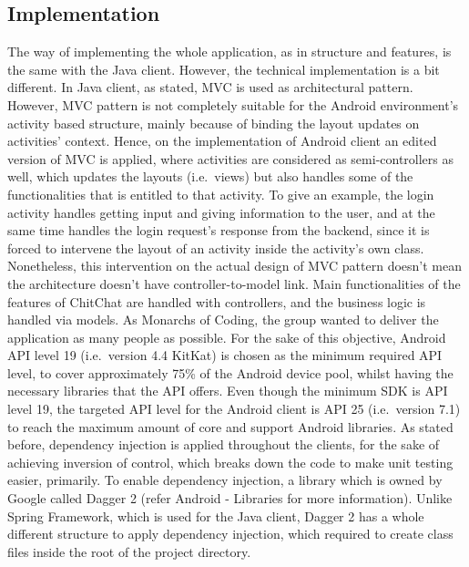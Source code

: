 \documentclass[11pt,a4paper]{report}
\begin{document}
\subsection{Implementation}
The way of implementing the whole application, as in structure and features, is the same with the Java client. However, the technical implementation is a bit different. In Java client, as stated, MVC is used as architectural pattern. However, MVC pattern is not completely suitable for the Android environment’s activity based structure, mainly because of binding the layout updates on activities’ context. Hence, on the implementation of Android client an edited version of MVC is applied, where activities are considered as semi-controllers as well, which updates the layouts (i.e.\ views) but also handles some of the functionalities that is entitled to that activity. To give an example, the login activity handles getting input and giving information to the user, and at the same time handles the login request’s response from the backend, since it is forced to intervene the layout of an activity inside the activity’s own class. Nonetheless, this intervention on the actual design of MVC pattern doesn’t mean the architecture doesn’t have controller-to-model link. Main functionalities of the features of ChitChat are handled with controllers, and the business logic is handled via models.
As Monarchs of Coding, the group wanted to deliver the application as many people as possible. For the sake of this objective, Android API level 19 (i.e.\ version 4.4 KitKat) is chosen as the minimum required API level, to cover approximately 75\% of the Android device pool, whilst having the necessary libraries that the API offers. Even though the minimum SDK is API level 19, the targeted API level for the Android client is API 25 (i.e.\ version 7.1) to reach the maximum amount of core and support Android libraries.
As stated before, dependency injection is applied throughout the clients, for the sake of achieving inversion of control, which breaks down the code to make unit testing easier, primarily. To enable dependency injection, a library which is owned by Google called Dagger 2 (refer Android - Libraries for more information). Unlike Spring Framework, which is used for the Java client, Dagger 2 has a whole different structure to apply dependency injection, which required to create class files inside the root of the project directory.
\end{document}

